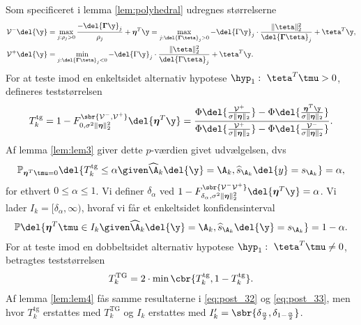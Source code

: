 Som specificeret i lemma \ref{lem:polyhedral} udregnes størrelserne
\begin{align*}
\mathcal{V}^- \del{\y} &=  \max_{j: \rho_j > 0} \frac{- \del{\boldsymbol{\Gamma} \y}_j}{\rho_j} + \boldsymbol{\eta}^T \y = \max_{j: \del{\boldsymbol{\Gamma} \teta}_j > 0} - \del{\Gamma \y}_j \cdot \frac{\Vert \teta \Vert_2^2}{\del{\boldsymbol{\Gamma} \teta}_j} + \teta^T \y, \\
\mathcal{V}^+ \del{\y} &=\min_{j: \del{\boldsymbol{\Gamma} \teta}_j < 0} - \del{\Gamma \y}_j \cdot \frac{\Vert \teta \Vert_2^2}{\del{\Gamma \teta}_j} + \teta^T \y.
\end{align*}
%
For at teste imod en enkeltsidet alternativ hypotese \(\hyp_1: \ \teta^T \tmu > 0\),  defineres teststørrelsen
\begin{align*}
T_k^\text{tg}=1- F_{0, \sigma^2 \Vert \boldsymbol{\eta} \Vert_2^2}^{\sbr{\mathcal{V}^-, \mathcal{V}^+}} \del{\boldsymbol{\eta}^T \y} = \frac{\Phi \del{\frac{\mathcal{V}^+}{\sigma \Vert \boldsymbol{\eta} \Vert_2}}-\Phi \del{\frac{\boldsymbol{\eta}^T \y}{\sigma  \Vert \boldsymbol{\eta} \Vert_2}}}{\Phi \del{\frac{\mathcal{V}^+}{\sigma  \Vert \boldsymbol{\eta} \Vert_2}}-\Phi \del{\frac{\mathcal{V}^-}{\sigma \Vert \boldsymbol{\eta} \Vert_2}}}.
\end{align*}
Af lemma \ref{lem:lem3} giver dette \(p\)-værdien givet udvælgelsen, dvs
\begin{align}
\mathbb{P}_{\boldsymbol{\eta}^T \tmu = 0} \del{T_k^\text{tg} \leq \alpha \given \widehat{\A}_k \del{\y} = \A_k, \widehat{s}_{\A_k} \del{y} = s_{\A_k}} = \alpha, \label{eq:post_32}
\end{align}
for ethvert \(0 \leq \alpha \leq 1\).
Vi definer  \(\delta_\alpha\) ved \(1-F_{\delta_{\alpha}, \sigma^2 \Vert \boldsymbol{\eta} \Vert_2^2}^{\sbr{\mathcal{V}^- \mathcal{V}^+}} \del{\boldsymbol{\eta}^T \y} = \alpha\).
Vi lader \(I_k = [\delta_\alpha, \infty)\), hvoraf vi får et enkeltsidet konfidensinterval
\begin{align}
\mathbb{P} \del{\boldsymbol{\eta}^T \tmu \in I_k \given \widehat{\A}_k \del{\y} = \A_k, \widehat{s}_{\A_k} \del{\y} = s_{\A_k}} = 1-\alpha. \label{eq:post_33}
\end{align}
For at teste imod en dobbeltsidet alternativ hypotese \(\hyp_1: \ \teta^T \tmu \neq 0\), betragtes teststørrelsen
\begin{align*}
T_k^\text{TG}= 2 \cdot \min \cbr{T_k^{\text{tg}}, 1-T_k^{\text{tg}}}.
\end{align*}
Af lemma \ref{lem:lem4} fås samme resultaterne i \eqref{eq:post_32} og \eqref{eq:post_33}, men hvor \(T_k^\text{tg}\) erstattes med \(T_k^\text{TG}\) og \(I_k\) erstattes med \(I_k'= \sbr{\delta_{\frac{\alpha}{2}}, \delta_{1-\frac{\alpha}{2}}}\).

